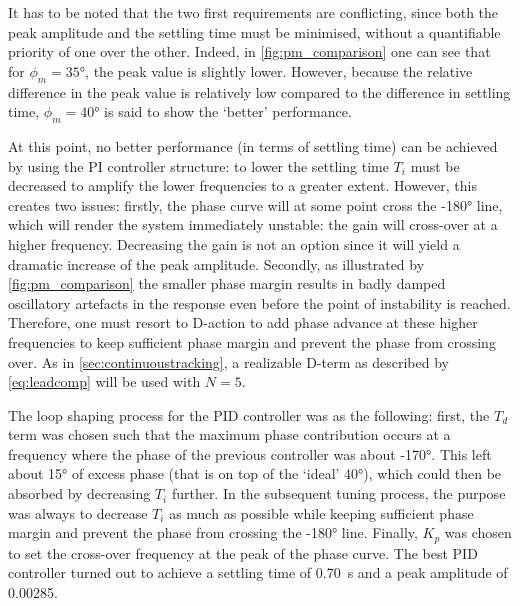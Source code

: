 It has to be noted that the two first requirements are conflicting, since both the peak amplitude and the settling time must be minimised, without a quantifiable priority of one over the other. Indeed, in \cref{fig:pm_comparison} one can see that for $\phi_m = \ang{35}$, the peak value is slightly lower. However, because the relative difference in the peak value is relatively low compared to the difference in settling time, $\phi_m = \ang{40}$ is said to show the `better' performance.

At this point, no better performance (in terms of settling time) can be achieved by using the PI controller structure: to lower the settling time $T_i$ must be decreased to amplify the lower frequencies to a greater extent. However, this creates two issues: firstly, the phase curve will at some point cross the \ang{-180} line, which will render the system immediately unstable: the gain will cross-over at a higher frequency. Decreasing the gain is not an option since it will yield a dramatic increase of the peak amplitude. Secondly, as illustrated by \cref{fig:pm_comparison} the smaller phase margin results in badly damped oscillatory artefacts in the response even before the point of instability is reached. Therefore, one must resort to D-action to add phase advance at these higher frequencies to keep sufficient phase margin and prevent the phase from crossing over. As in \cref{sec:continuoustracking}, a realizable D-term as described by \cref{eq:leadcomp} will be used with $N = 5$. 

The loop shaping process for the PID controller was as the following: first, the $T_d$ term was chosen such that the maximum phase contribution occurs at a frequency where the phase of the previous controller was about \ang{-170}. This left about \ang{15} of excess phase (that is on top of the `ideal' \ang{40}), which could then be absorbed by decreasing $T_i$ further. In the subsequent tuning process, the purpose was always to decrease $T_i$ as much as possible while keeping sufficient phase margin and prevent the phase from crossing the \ang{-180} line. Finally, $K_p$ was chosen to set the cross-over frequency at the peak of the phase curve. The best PID controller turned out to achieve a settling time of \SI{0.70}{\second} and a peak amplitude of \num{0.00285}.

